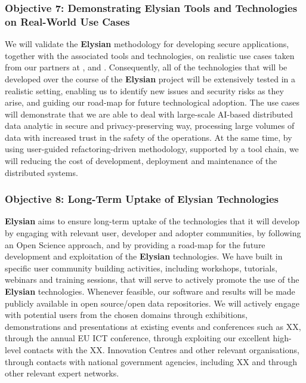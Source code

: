 \documentclass[a4paper,11pt]{article}
\newcommand{\project}[1]{\textbf{#1}\xspace}
\newcommand{\SECURITY}{\project{Elysian}}
\newcommand{\TheProject}{\SECURITY}
\begin{document}
\subsubsection*{Objective 7: Demonstrating \TheProject{} Tools and Technologies on Real-World Use Cases}
\vspace{-6pt}
We will validate the \TheProject{} methodology for developing secure applications, together with the associated tools and technologies, on realistic use cases taken from our partners at \SOPRAshort{}, \FRQshort{} and \DEMshort{}.
Consequently, all of the technologies that will be developed over the course of the \TheProject{} project will be extensively tested in a realistic setting, enabling us to identify new issues and security risks as they arise, and guiding our road-map for future technological adoption. The use cases will demonstrate that we are able to deal with large-scale AI-based distributed data analytic in secure and privacy-preserving way, processing large volumes of data with increased trust in the safety of the operations. At the same time, by using user-guided refactoring-driven methodology, supported by a tool chain, we will reducing the cost of development, deployment and maintenance of the distributed systems.

\subsubsection*{Objective 8: Long-Term Uptake of \TheProject{} Technologies} 
\vspace{-7pt}
\TheProject{} aims to ensure long-term uptake of the technologies that it will develop by engaging with relevant user, developer and adopter communities, by following an Open Science approach, and by providing a road-map for the future development and exploitation of the \TheProject{} technologies. We have built in specific user community building activities, including workshops, tutorials, webinars and training sessions, that will serve to actively promote the use of the \TheProject{} technologies. Whenever feasible, our software and results will be made publicly available in open source/open data repositories. We will actively engage with potential users from the chosen domains through exhibitions, demonstrations and presentations at existing events and conferences such as XX, through the annual EU ICT conference, through exploiting our excellent high-level contacts with the XX. Innovation Centres and other relevant organisations, through contacts with national government agencies, including XX and through other relevant expert networks.
\end{document}

